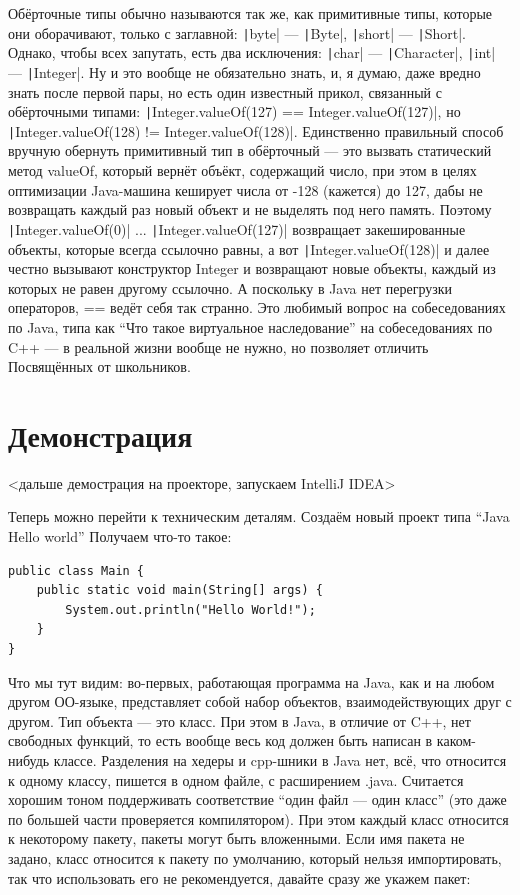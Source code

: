\documentclass[a5paper]{article}
\begin{document}
Обёрточные типы обычно называются так же, как примитивные типы, которые они оборачивают, только с заглавной: \texttt|byte| --- \texttt|Byte|, \texttt|short| --- \texttt|Short|. Однако, чтобы всех запутать, есть два исключения: \texttt|char| --- \texttt|Character|, \texttt|int| --- \texttt|Integer|. Ну и это вообще не обязательно знать, и, я думаю, даже вредно знать после первой пары, но есть один известный прикол, связанный с обёрточными типами: \texttt|Integer.valueOf(127) == Integer.valueOf(127)|, но \texttt|Integer.valueOf(128) != Integer.valueOf(128)|. Единственно правильный способ вручную обернуть примитивный тип в обёрточный --- это вызвать статический метод valueOf, который вернёт объёкт, содержащий число, при этом в целях оптимизации Java-машина кеширует числа от -128 (кажется) до 127, дабы не возвращать каждый раз новый объект и не выделять под него память. Поэтому \texttt|Integer.valueOf(0)| ... \texttt|Integer.valueOf(127)| возвращает закешированные объекты, которые всегда ссылочно равны, а вот \texttt|Integer.valueOf(128)| и далее честно вызывают конструктор Integer и возвращают новые объекты, каждый из которых не равен другому ссылочно. А поскольку в Java нет перегрузки операторов, == ведёт себя так странно. Это любимый вопрос на собеседованиях по Java, типа как ``Что такое виртуальное наследование'' на собеседованиях по C++ --- в реальной жизни вообще не нужно, но позволяет отличить Посвящённых от школьников.

\section{Демонстрация}

<дальше демострация на проекторе, запускаем IntelliJ IDEA>

Теперь можно перейти к техническим деталям. Создаём новый проект типа ``Java Hello world'' Получаем что-то такое:

\begin{verbatim}
public class Main {
    public static void main(String[] args) {
        System.out.println("Hello World!");
    }
}
\end{verbatim}

Что мы тут видим: во-первых, работающая программа на Java, как и на любом другом ОО-языке, представляет собой набор объектов, взаимодействующих друг с другом. Тип объекта --- это класс. При этом в Java, в отличие от C++, нет свободных функций, то есть вообще весь код должен быть написан в каком-нибудь классе. Разделения на хедеры и cpp-шники в Java нет, всё, что относится к одному классу, пишется в одном файле, с расширением .java. Считается хорошим тоном поддерживать соответствие ``один файл --- один класс'' (это даже по большей части проверяется  компилятором). При этом каждый класс относится к некоторому пакету, пакеты могут быть вложенными. Если имя пакета не задано, класс относится к пакету по умолчанию, который нельзя импортировать, так что использовать его не рекомендуется, давайте сразу же укажем пакет:
\end{document}

